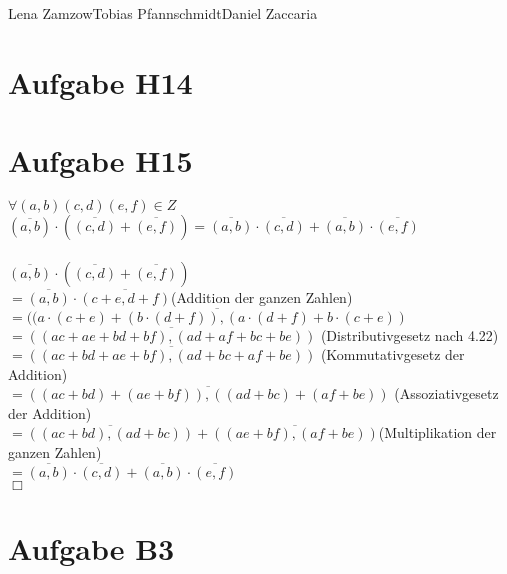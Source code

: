 \documentclass[11pt,a4paper]{article}
\begin{document}
                {Lena Zamzow}{Tobias Pfannschmidt}{Daniel Zaccaria}{}{}


\section*{Aufgabe H14}
\section*{Aufgabe H15}
$\forall (a,b)(c,d)(e,f) \in Z$\\
$ (\overline{a,b}) \cdot ( \overline{(c,d)} + \overline{(e,f)} ) = \overline{(a,b)} \cdot \overline{(c,d)} + \overline{(a,b)} \cdot \overline{(e,f)}$\\
\\
$ \overline{(a,b)} \cdot ( \overline{(c,d)} + \overline{(e,f)} )$\\
$ = \overline{(a,b)} \cdot \overline{(c+e,d+f)}$(Addition der ganzen Zahlen)\\
$ = \overline{((a \cdot (c+e) + (b \cdot (d+f)), (a \cdot (d+f)+ b \cdot (c+e))}$\\
$ = \overline{((ac+ae+bd+bf),(ad+af+bc+be))}$ (Distributivgesetz nach 4.22)\\
$ = \overline{((ac+bd+ae+bf),(ad+bc+af+be))}$ (Kommutativgesetz der Addition)\\
$ = \overline{((ac+bd)+(ae+bf)),((ad+bc)+(af+be))}$ (Assoziativgesetz der Addition)\\
$ = \overline{((ac+bd),(ad+bc))} + \overline{((ae+bf),(af+be))}$(Multiplikation der ganzen Zahlen)\\
$ = \overline{(a,b)} \cdot \overline{(c,d)} + \overline{(a,b)} \cdot \overline{(e,f)}$\\
$\Box$\\

\section*{Aufgabe B3}
\end{document}
